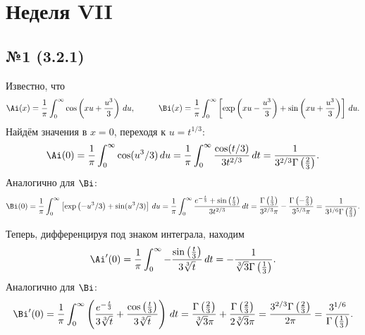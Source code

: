 \section{Неделя VII}

\subsection*{№1 (3.2.1)}

Известно, что 
\begin{equation*}
    \Ai (x) = \frac{1}{\pi} \int_{0}^{\infty} \cos\left(x u + \frac{u^3}{3}\right) \d u,
    \hspace{10 mm} 
    \Bi(x) = \frac{1}{\pi} \int_{0}^{\infty} \left[
        \exp\left(x u - \frac{u^3}{3}\right) + \sin\left(x u + \frac{u^3}{3}\right)
    \right] \d u.
\end{equation*}
Найдём значения в $x = 0$, переходя к $u = t^{1/3}$:
\begin{equation*}
    \Ai(0) = \frac{1}{\pi} \int_{0}^{\infty} \cos( u^3/3) \d u = 
    \frac{1}{\pi} \int_{0}^{\infty} \frac{\cos(t/3) }{3 t^{2/3}}\d t = \frac{1}{3^{2/3} \Gamma\left(\frac{2}{3}\right)}.
\end{equation*}
Аналогично для $\Bi$:
\begin{equation*}
    \Bi(0) = \frac{1}{\pi} \int_{0}^{\infty} \left[
        \exp\left( - u^3/3\right) + \sin( u^3/3)
    \right] \d u = 
    \frac{1}{\pi} \int_{0}^{\infty} \frac{e^{-\frac{t}{3}}+\sin \left(\frac{t}{3}\right)}{3 t^{2/3}} \d t =  
    \frac{\Gamma \left(\frac{1}{3}\right)}{3^{2/3} \pi } -\frac{\Gamma \left(-\frac{2}{3}\right)}{3^{5/3} \pi } = \frac{1}{3^{1/6} \Gamma\left(\frac{2}{3}\right)}.
\end{equation*}

Теперь, дифференцируя под знаком интеграла, находим
\begin{equation*}
    \Ai'(0) = 
    \frac{1}{\pi} \int_{0}^{\infty} 
    -\frac{\sin \left(\frac{t}{3}\right)}{3 \sqrt[3]{t}}
    \d t = -\frac{1}{\sqrt[3]{3} \Gamma \left(\frac{1}{3}\right)}.
\end{equation*}
Аналогично для $\Bi$:
\begin{equation*}
    \Bi'(0) = 
    \frac{1}{\pi} \int_{0}^{\infty} 
    \left(
        \frac{e^{-\frac{t}{3}}}{3 \sqrt[3]{t}}+\frac{\cos \left(\frac{t}{3}\right)}{3 \sqrt[3]{t}}
    \right)
    \d t = \frac{\Gamma \left(\frac{2}{3}\right)}{\sqrt[3]{3} \pi } + \frac{\Gamma \left(\frac{2}{3}\right)}{2 \sqrt[3]{3} \pi } = \frac{3^{2/3} \Gamma \left(\frac{2}{3}\right)}{2 \pi } = \frac{3^{1/6}}{\Gamma\left(\frac{1}{3}\right)}.
\end{equation*}